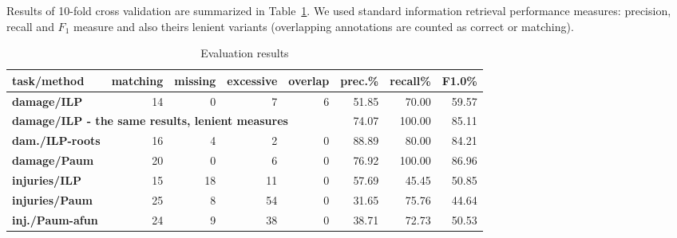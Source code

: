 \documentclass[runningheads,a4paper]{llncs}
\begin{document}


Results of 10-fold cross validation are summarized in Table~\ref{tab:EvaluationResults}. We used standard information retrieval performance measures: precision, recall and $F_1$ measure and also theirs lenient variants (overlapping annotations are counted as correct or matching).

\begin{table}[t]
	\centering
			
\begin{tabular}{|l||r|r|r|r|r|r|r|}
\hline
\textbf{task/method} & \textbf{matching} & \textbf{missing} & \textbf{excessive} & \textbf{overlap} & \textbf{prec.}\% & \textbf{recall}\% & \textbf{F1.0}\%\\
\hline
\hline
\textbf{damage/ILP} & 14 & 0 & 7 & 6 & 51.85 & 70.00 & 59.57\\
\hline
\multicolumn{5}{|l|}{\textbf{damage/ILP - the same results, lenient measures}} & 74.07 & 100.00 & 85.11\\
\hline
\textbf{dam./ILP-roots} & 16 & 4 & 2 & 0 & 88.89 & 80.00 & 84.21\\
\hline
\textbf{damage/Paum} & 20 & 0 & 6 & 0 & 76.92 & 100.00 & 86.96\\
\hline
\hline
\textbf{injuries/ILP} & 15 & 18 & 11 & 0 & 57.69 & 45.45 & 50.85\\
\hline
\textbf{injuries/Paum} & 25 & 8 & 54 & 0 & 31.65 & 75.76 & 44.64\\
\hline
\textbf{inj./Paum-afun} & 24 & 9 & 38 & 0 & 38.71 & 72.73 & 50.53\\
\hline
\end{tabular}
						
	\caption{Evaluation results }
	\label{tab:EvaluationResults}
\end{table}
\end{document}
